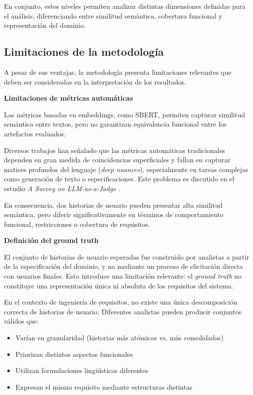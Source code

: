 En conjunto, estos niveles permiten analizar distintas dimensiones definidas para el análisis, diferenciando entre similitud semántica, cobertura funcional y representación del dominio.

\subsection{Limitaciones de la metodología}

A pesar de sus ventajas, la metodología presenta limitaciones relevantes que deben ser consideradas en la interpretación de los resultados.

\textbf{Limitaciones de métricas automáticas}

Las métricas basadas en embeddings, como SBERT, permiten capturar similitud semántica entre textos, pero no garantizan equivalencia funcional entre los artefactos evaluados.

Diversos trabajos han señalado que las métricas automáticas tradicionales dependen en gran medida de coincidencias superficiales y fallan en capturar matices profundos del lenguaje (\textit{deep nuances}), especialmente en tareas complejas como generación de texto o especificaciones. Este problema es discutido en el estudio \textit{A Survey on LLM-as-a-Judge} \cite{llm_judge_survey_2024}.

En consecuencia, dos historias de usuario pueden presentar alta similitud semántica, pero diferir significativamente en términos de comportamiento funcional, restricciones o cobertura de requisitos.

\textbf{Definición del ground truth}

El conjunto de historias de usuario esperadas fue construido por analistas a partir de la especificación del dominio, y no mediante un proceso de elicitación directa con usuarios finales. Esto introduce una limitación relevante: el \textit{ground truth} no constituye una representación única ni absoluta de los requisitos del sistema.

En el contexto de ingeniería de requisitos, no existe una única descomposición correcta de historias de usuario. Diferentes analistas pueden producir conjuntos válidos que:

\begin{itemize}
    \item Varían en granularidad (historias más atómicas vs. más consolidadas)
    \item Priorizan distintos aspectos funcionales
    \item Utilizan formulaciones lingüísticas diferentes
    \item Expresan el mismo requisito mediante estructuras distintas
\end{itemize}

